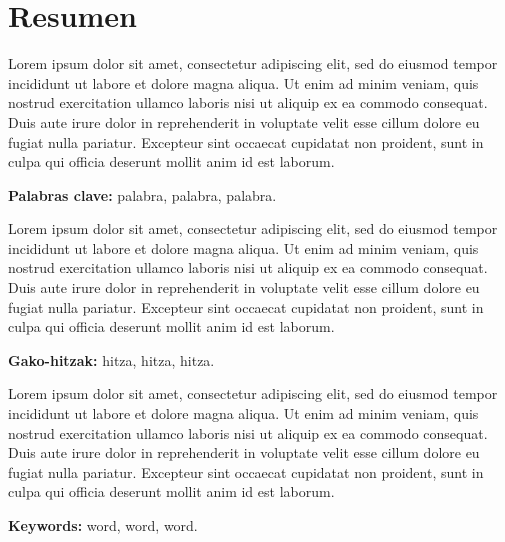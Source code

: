 \chapter*{Resumen }

Lorem ipsum dolor sit amet, consectetur adipiscing elit, sed do eiusmod tempor incididunt ut labore et dolore magna aliqua. Ut enim ad minim veniam, quis nostrud exercitation ullamco laboris nisi ut aliquip ex ea commodo consequat. Duis aute irure dolor in reprehenderit in voluptate velit esse cillum dolore eu fugiat nulla pariatur. Excepteur sint occaecat cupidatat non proident, sunt in culpa qui officia deserunt mollit anim id est laborum.

\textbf{Palabras clave:} palabra, palabra, palabra.


\textcolor{eus-color}{{\serif Lorem ipsum dolor sit amet, consectetur adipiscing elit, sed do eiusmod tempor incididunt ut labore et dolore magna aliqua. Ut enim ad minim veniam, quis nostrud exercitation ullamco laboris nisi ut aliquip ex ea commodo consequat. Duis aute irure dolor in reprehenderit in voluptate velit esse cillum dolore eu fugiat nulla pariatur. Excepteur sint occaecat cupidatat non proident, sunt in culpa qui officia deserunt mollit anim id est laborum.}}

\textcolor{eus-color}{{\serif \textbf{Gako-hitzak:}} hitza, hitza, hitza.}


\textcolor{eng-color}{Lorem ipsum dolor sit amet, consectetur adipiscing elit, sed do eiusmod tempor incididunt ut labore et dolore magna aliqua. Ut enim ad minim veniam, quis nostrud exercitation ullamco laboris nisi ut aliquip ex ea commodo consequat. Duis aute irure dolor in reprehenderit in voluptate velit esse cillum dolore eu fugiat nulla pariatur. Excepteur sint occaecat cupidatat non proident, sunt in culpa qui officia deserunt mollit anim id est laborum.}

\textcolor{eng-color}{\textbf{Keywords:} word, word, word.}